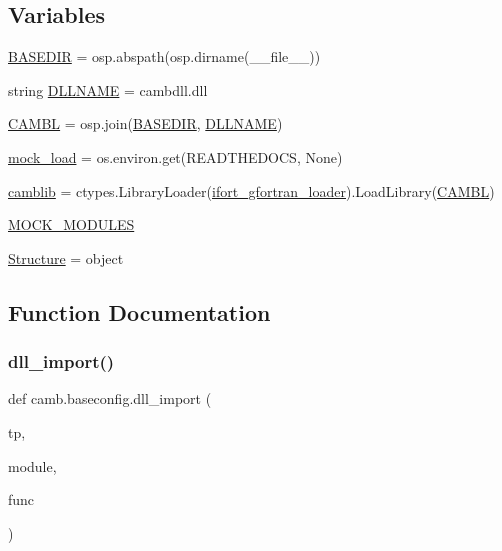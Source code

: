 \subsection*{Variables}
\begin{DoxyCompactItemize}
\item 
\mbox{\hyperlink{namespacecamb_1_1baseconfig_ae8f1ea2a46e79a477468b0fd2d177a99}{B\+A\+S\+E\+D\+IR}} = osp.\+abspath(osp.\+dirname(\+\_\+\+\_\+file\+\_\+\+\_\+))
\item 
string \mbox{\hyperlink{namespacecamb_1_1baseconfig_ad89a604599cedf48442529187fef9c80}{D\+L\+L\+N\+A\+ME}} = \textquotesingle{}cambdll.\+dll\textquotesingle{}
\item 
\mbox{\hyperlink{namespacecamb_1_1baseconfig_a1607a579d676f0ac85591b4682448c59}{C\+A\+M\+BL}} = osp.\+join(\mbox{\hyperlink{namespacecamb_1_1baseconfig_ae8f1ea2a46e79a477468b0fd2d177a99}{B\+A\+S\+E\+D\+IR}}, \mbox{\hyperlink{namespacecamb_1_1baseconfig_ad89a604599cedf48442529187fef9c80}{D\+L\+L\+N\+A\+ME}})
\item 
\mbox{\hyperlink{namespacecamb_1_1baseconfig_a7929d68edfa88d189f12fd1c25f0448f}{mock\+\_\+load}} = os.\+environ.\+get(\textquotesingle{}R\+E\+A\+D\+T\+H\+E\+D\+O\+CS\textquotesingle{}, None)
\item 
\mbox{\hyperlink{namespacecamb_1_1baseconfig_a358d9edf830d88f0b129ba636e49a077}{camblib}} = ctypes.\+Library\+Loader(\mbox{\hyperlink{classcamb_1_1baseconfig_1_1ifort__gfortran__loader}{ifort\+\_\+gfortran\+\_\+loader}}).Load\+Library(\mbox{\hyperlink{namespacecamb_1_1baseconfig_a1607a579d676f0ac85591b4682448c59}{C\+A\+M\+BL}})
\item 
\mbox{\hyperlink{namespacecamb_1_1baseconfig_ad1eeb57f2c324b0a0486fa69bea1088e}{M\+O\+C\+K\+\_\+\+M\+O\+D\+U\+L\+ES}}
\item 
\mbox{\hyperlink{namespacecamb_1_1baseconfig_ac76caa9250c766ee3239467a4e1b817f}{Structure}} = object
\end{DoxyCompactItemize}


\subsection{Function Documentation}
\mbox{\label{namespacecamb_1_1baseconfig_a9b1d79118c94ceaefe44393d881c3956}} 
\subsubsection{\texorpdfstring{dll\+\_\+import()}{dll\_import()}}
{\footnotesize\ttfamily def camb.\+baseconfig.\+dll\+\_\+import (\begin{DoxyParamCaption}\item[{}]{tp,  }\item[{}]{module,  }\item[{}]{func }\end{DoxyParamCaption})}



